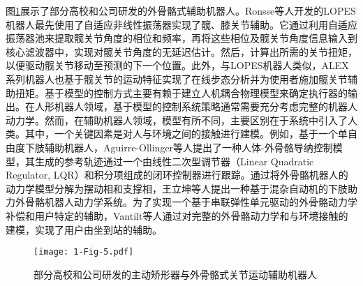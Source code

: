 图\ref{fig:1-5}展示了部分高校和公司研发的外骨骼式辅助机器人。Ronsse等人\cite{ronsseOscillatorbasedAssistanceCyclical2011c}开发的LOPES机器人最先使用了自适应非线性振荡器实现了髋、膝关节辅助。它通过利用自适应振荡器池来提取髋关节角度的相位和频率，再将这些相位及髋关节角度信息输入到核心滤波器中，实现对髋关节角度的无延迟估计。然后，计算出所需的关节扭矩，以便驱动髋关节移动至预测的下一个位置。此外，与LOPES机器人类似，ALEX系列机器人\cite{winfreeDesignMinimallyConstraining2011,stegallVariableDampingForce2017,hidayahGaitAdaptationUsing2020}也基于髋关节的运动特征实现了在线步态分析并为使用者施加髋关节辅助扭矩。基于模型的控制方式主要有赖于建立人机耦合物理模型来确定执行器的输出。在人形机器人领域，基于模型的控制系统策略通常需要充分考虑完整的机器人动力学。然而，在辅助机器人领域，模型有所不同，主要区别在于系统中引入了人类。其中，一个关键因素是对人与环境之间的接触进行建模\cite{youngStateArtFuture2017a}。例如，基于一个单自由度下肢辅助机器人，Aguirre-Ollinger等人\cite{aguirre-ollingerInertiaCompensationControl2012}提出了一种人体-外骨骼导纳控制模型，其生成的参考轨迹通过一个由线性二次型调节器（Linear Quadratic Regulator, LQR）和积分项组成的闭环控制器进行跟踪。通过将外骨骼机器人的动力学模型分解为摆动相和支撑相，王立坤等人\cite{WangXiaZhiZhuLiWaiGuGeJiQiRenKongZhiXiTongRenJiGongRongCeLueYanJiu2019}提出一种基于混杂自动机的下肢助力外骨骼机器人动力学系统。为了实现一个基于串联弹性单元驱动的外骨骼动力学补偿和用户特定的辅助，Vantilt等人\cite{vantiltModelbasedControlExoskeletons2019}通过对完整的外骨骼动力学和与环境接触的建模，实现了用户由坐到站的辅助。

\begin{figure}[h]
  \centering
  \texttt{[image: 1-Fig-5.pdf]}
  \caption{部分高校和公司研发的主动矫形器与外骨骼式关节运动辅助机器人}
  \label{fig:1-5}
\end{figure}

